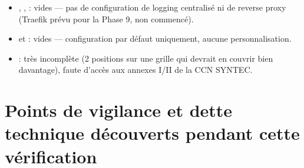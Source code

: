 \documentclass[11pt,a4paper]{article}
\begin{document}
\begin{itemize}[leftmargin=1.3em]
\item {}, ,  : vides --- pas de configuration de logging centralis\'e ni de reverse proxy (Traefik pr\'evu pour la Phase 9, non commenc\'e).
\item {} et  : vides --- configuration par d\'efaut uniquement, aucune personnalisation.
\item {} :  tr\`es incompl\`ete (2 positions sur une grille qui devrait en couvrir bien davantage), faute d'acc\`es aux annexes I/II de la CCN SYNTEC.
\end{itemize}

\section{Points de vigilance et dette technique d\'ecouverts pendant cette v\'erification}
\label{sec:dette}
\end{document}
